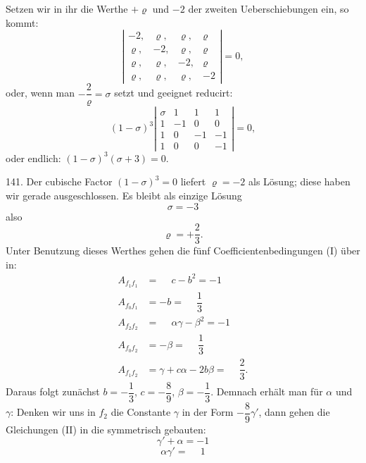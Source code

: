 Setzen wir in ihr die Werthe $+\varrho$ und $-2$ der zweiten Ueberschiebungen
 ein, so kommt:
\[
\left|\begin{array}{cccc}
-2, & \varrho, & \varrho, & \varrho \\
\varrho, & -2, & \varrho, & \varrho \\
\varrho, & \varrho, & -2, & \varrho \\
\varrho, & \varrho, & \varrho, & -2
\end{array}\right| = 0,
\]
oder, wenn man $-\dfrac{2}{\varrho} = \sigma$ setzt und geeignet reducirt:
\[
(1 - \sigma)^3 \left|\begin{array}{cccc}
\sigma & 1 & 1 & 1 \\
1 & -1 & 0 & 0 \\
1 & 0 & -1 & -1 \\
1 & 0 & 0 & -1
\end{array}\right| = 0,
\]
oder endlich: $(1 - \sigma)^3(\sigma + 3) = 0.$

141. Der cubische Factor $(1 - \sigma)^3 = 0$ liefert $\varrho = -2$ als Lösung;
diese haben wir gerade ausgeschlossen. Es bleibt als einzige Lösung
\[
\sigma = -3
\]
also
\[
\varrho = +\frac{2}{3}.
\]
Unter Benutzung dieses Werthes gehen die fünf Coefficientenbedingungen
(I) über in:
\[
\begin{aligned}
A_{f_1f_1} &= \phantom{-}c - b^2 = -1 \\
A_{f_0f_1} &= -b = \phantom{-}\dfrac{1}{3} \\
A_{f_2f_2} &= \phantom{-}\alpha\gamma - \beta^2 = -1 \\
A_{f_0f_2} &= -\beta = \phantom{-}\dfrac{1}{3} \\
A_{f_1f_2} &= \gamma + c\alpha - 2b\beta = \phantom{-}\dfrac{2}{3}.
\end{aligned}
\]
Daraus folgt zunächst $b = -\dfrac{1}{3}$, $c = -\dfrac{8}{9}$, $\beta = -\dfrac{1}{3}$. Demnach
erhält man für $\alpha$ und $\gamma$:
Denken wir uns in $f_2$ die Constante $\gamma$ in der Form $-\dfrac{8}{9}\gamma'$, dann
gehen die Gleichungen (II) in die symmetrisch gebauten:
\[
\gamma' + \alpha = -1
\]
\[
\alpha\gamma' = \phantom{-}1
\]


